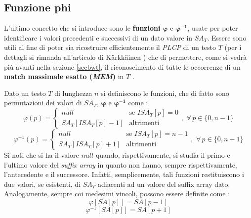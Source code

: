 \subsection{Funzione phi}
L'ultimo concetto che si introduce sono le \textbf{funzioni}
$\boldsymbol\varphi$ e $\mathbf{\boldsymbol\varphi^{-1}}$, usate per poter
identificare i valori precedenti e successivi di 
un dato valore in $SA_T$. Essere sono utili al fine di poter sia ricostruire
efficientemente il \textit{PLCP} di un testo $T$ (per i dettagli si rimanda
all'articolo di K\"{a}rkk\"{a}inen \cite{plcp}) che di permettere, come si vedrà
più  avanti nella sezione \ref{secbwt}, il riconoscimento di tutte le occorrenze
di un \textbf{match massimale esatto (\textit{MEM})} in $T$ \cite{phoni}.
\begin{definizione}
  Dato un testo $T$ di lunghezza $n$ si definiscono le funzioni, che di fatto
  sono permutazioni dei valori di $SA_T$, $\boldsymbol\varphi$ e
  $\mathbf{\boldsymbol\varphi^{-1}}$ come \cite{phoni}: 
  \begin{equation}
    \label{eq:phidef1}
    \varphi(p)=
    \begin{cases}
      null&\mbox{se } ISA_T[p]=0\\
      SA_T[ISA_T[p]-1]&\mbox{altrimenti}
    \end{cases},\,\,\forall\, p\in\{0,n-1\}
  \end{equation}
  \begin{equation}
    \label{eq:phiinvdef1}
    \varphi^{-1}(p)=
    \begin{cases}
      null&\mbox{se } ISA_T[p]=n-1\\
      SA_T[ISA_T[p]+1]&\mbox{altrimenti}
    \end{cases},\,\,\forall\, p\in\{0,n-1\}
  \end{equation}
  Si noti che si ha il valore $null$ quando, rispettivamente, si studia il
  primo e l'ultimo valore del \textit{suffix array} in quanto non hanno, sempre
  rispettivamente, l'antecedente e il successore.   Infatti, semplicemente, tali
  funzioni restituiscono i due valori, se 
  esistenti, di $SA_T$ adiacenti ad un valore del suffix array dato.\\
  Analogamente, sempre coi medesimi vincoli, possono essere definite come
  \cite{plcp}: 
  \begin{equation}
    \label{eq:phidef2}
    \varphi[SA[p]]=SA[p-1]
  \end{equation}
  \begin{equation}
    \label{eq:phiinvdef2}
    \varphi^{-1}[SA[p]]=SA[p+1]
  \end{equation}

\end{definizione}
